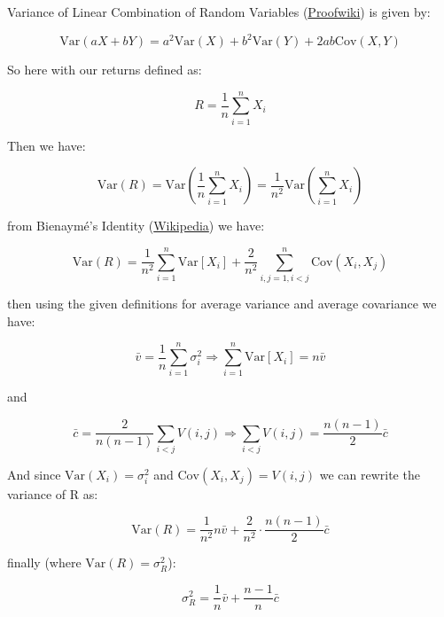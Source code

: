 \documentclass[10pt]{article}
\begin{document}
\divider

Variance of Linear Combination of Random Variables (\href{https://proofwiki.org/wiki/Variance_of_Linear_Combination_of_Random_Variables}{Proofwiki}) is given by:

\[ \text{Var}\left(aX + bY \right) = a^2 \text{Var}(X) + b^2 \text{Var}(Y) + 2ab \text{Cov}(X, Y) \]

So here with our returns defined as:

\[ R = \frac{1}{n} \sum_{i=1}^{n} X_i \]

Then we have:

\[ \text{Var}(R) = \text{Var}\left(\frac{1}{n} \sum_{i=1}^{n} X_i \right) = \frac{1}{n^2} \text{Var}\left(\sum_{i=1}^{n} X_i \right) \]

from Bienaymé's Identity (\href{https://en.wikipedia.org/wiki/Bienaym%C3%A9%27s_identity#cite_note-1}{Wikipedia}) we have:

\[ \text{Var}\left(R \right) = \frac{1}{n^2} \sum_{i=1}^{n} \text{Var}[X_i] + \frac{2}{n^2} \sum_{i,j=1, i<j}^n \text{Cov}(X_i, X_j) \]

then using the given definitions for average variance and average covariance we have:

\[ \bar{v} = \frac{1}{n} \sum_{i=1}^{n} \sigma_i^2 \Rightarrow \sum_{i=1}^{n} \text{Var}[X_i] = n \bar{v} \]

and

\[ \bar{c} = \frac{2}{n(n - 1)} \sum_{i<j} V(i, j) \Rightarrow \sum_{i<j} V(i, j) = \frac{n(n-1)}{2} \bar{c} \]

And since $\text{Var}(X_i) = \sigma_i^2$ and $\text{Cov}(X_i, X_j) = V(i, j)$ we can rewrite the variance of R as:

\[ \text{Var}(R) = \frac{1}{n^2} n \bar{v} + \frac{2}{n^2} \cdot \frac{n(n-1)}{2}\bar{c} \]


finally (where $\text{Var}(R) = \sigma_R^2$):

\[ \boxed{\sigma_R^2 = \frac{1}{n} \bar{v} + \frac{n - 1}{n} \bar{c}} \]
\end{document}
